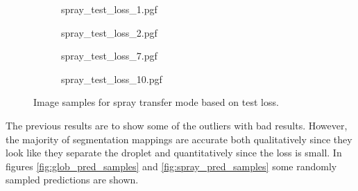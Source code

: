 \begin{figure}
  \begin{subfigure}[b]{0.45\textwidth}
    {spray_test_loss_1.pgf}
    \caption{}
  \end{subfigure}
\hfill
  \begin{subfigure}[b]{0.45\textwidth}
    {spray_test_loss_2.pgf}
    \caption{}
  \end{subfigure}
 \vfill
  \begin{subfigure}[b]{0.45\textwidth}
    {spray_test_loss_7.pgf}
    \caption{}
  \end{subfigure}
\hfill
  \begin{subfigure}[b]{0.45\textwidth}
    {spray_test_loss_10.pgf}
    \caption{}
    \label{fig:spray_loss_samples_d}
  \end{subfigure}
  \caption[Image samples for spray transfer mode based on test loss]{Image samples for spray transfer mode based on test loss.}
  \label{fig:spray_loss_samples}
\end{figure}

The previous results are to show some of the outliers with bad results. However, the majority of segmentation mappings are accurate both qualitatively since they look like they separate the droplet and quantitatively since the loss is small. In figures \ref{fig:glob_pred_samples} and \ref{fig:spray_pred_samples} some randomly sampled predictions are shown.

